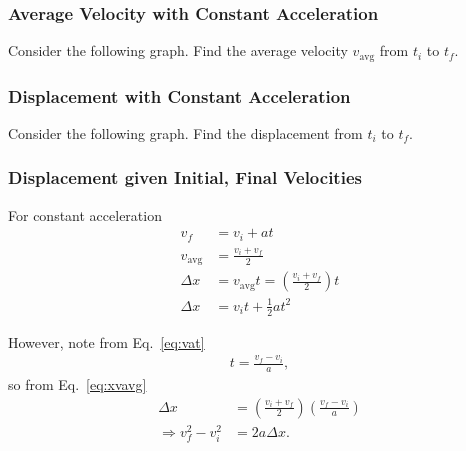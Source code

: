\documentclass[20pt]{beamer}
\begin{document}
\begin{frame}
	\frametitle{Average Velocity with Constant Acceleration}
	\begin{example}
		Consider the following graph. Find the average velocity $v_\mathrm{avg}$ from $t_i$ to $t_f$.
		\begin{figure}[ht]
			\centering
			\label{fig:avg-velocity}
		\end{figure}
	\end{example}
\end{frame}

\begin{frame}
	\frametitle{Displacement with Constant Acceleration}
	\begin{example}
		Consider the following graph. Find the displacement from $t_i$ to $t_f$.
		\begin{figure}[ht]
			\centering
			\mplfig{constant-a.pgf}
			\label{fig:displacement}
		\end{figure}
	\end{example}
\end{frame}

\begin{frame}
	\frametitle{Displacement given Initial, Final Velocities}
	\begin{theorem}
		For constant acceleration
		\begin{align}
			v_f            & = v_i + at \label{eq:vat}                                                \\
			v_\mathrm{avg} & = \frac{v_i + v_f}{2}                                                    \\
			\Delta x       & = v_\mathrm{avg} t = \left(\frac{v_i + v_f}{2}\right) t \label{eq:xvavg} \\
			\Delta x       & = v_i t + \frac{1}{2}at^2
		\end{align}
	\end{theorem}
	However, note from Eq.~\eqref{eq:vat}
	\begin{align*}
		t = \frac{v_f - v_i}{a},
	\end{align*}
	so from Eq.~\eqref{eq:xvavg}
	\begin{align*}
		\Delta x                  & = \left(\frac{v_i + v_f}{2}\right) \left(\frac{v_f - v_i}{a}\right) \\
		\Rightarrow v_f^2 - v_i^2 & = 2a \Delta x.
	\end{align*}
\end{frame}
\end{document}
